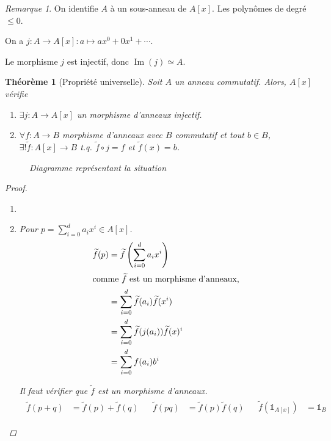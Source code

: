 \documentclass{report}
\newtheorem*{thm}{Th\'eor\`eme}
\theoremstyle{definition}
\theoremstyle{remark}
\newtheorem*{rmq}{Remarque}
\def\lte{\leqslant}
\def\id{\mathds{1}}
\def\im{\operatorname{Im}}
\begin{document}
	\begin{rmq}
		On identifie $A$ \`a un sous-anneau de $A[x]$. Les polyn\^omes de degr\'e $\lte 0$.

		On a $j : A\to A[x] : a\mapsto ax^0+0x^1+\cdots$.

		Le morphisme $j$ est injectif, donc $\im(j)\simeq A$.
	\end{rmq}

	\begin{thm}[Propri\'et\'e universelle]
		Soit $A$ un anneau commutatif. Alors, $A[x]$ v\'erifie
		\begin{enumerate}
			\item $\exists j:A\to A[x]$ un morphisme d'anneaux injectif.
			\item $\forall f:A\to B$ morphisme d'anneaux avec $B$ commutatif et tout $b\in B$, $\exists!\widetilde{f}:A[x]\to B$ t.q. $\widetilde{f}\circ j=f$ et $\widetilde{f}(x)=b$.
		\end{enumerate}
		\begin{figure}[h]
			\centering
			\caption{Diagramme repr\'esentant la situation}
		\end{figure}

		\begin{proof}
			\begin{enumerate}
				\item \checkmark
				\item Pour $p=\sum_{i=0}^{d}a_ix^i\in A[x]$.
				\begin{align*}
					\widetilde{f}(p)&= \widetilde{f}\left( \sum_{i=0}^{d}a_ix^i \right)\\
					\shortintertext{comme $\widetilde{f}$ est un morphisme d'anneaux,}
					&= \sum_{i=0}^{d}\widetilde{f}(a_i) \widetilde{f}(x^i)\\
					&= \sum_{i=0}^{d}\widetilde{f}(j(a_i)) \widetilde{f}(x)^i\\
					&= \sum_{i=0}^{d}f(a_i)b^i
				\end{align*}

				Il faut v\'erifier que $\widetilde{f}$ est un morphisme d'anneaux.
				\begin{align*}
					\begin{split}
						\widetilde{f}(p+q)&= \widetilde{f}(p)+\widetilde{f}(q)
					\end{split}
					&
					\begin{split}
						\widetilde{f}(pq)&= \widetilde{f}(p)\widetilde{f}(q)
					\end{split}
					&
					\begin{split}
						\widetilde{f}(\id_{A[x]})&= \id_B
					\end{split}
				\end{align*}


\end{enumerate}
\end{proof}
\end{thm}
\end{document}
